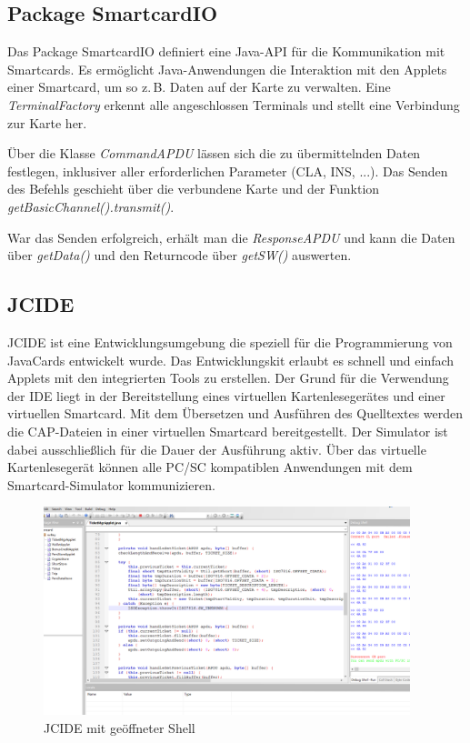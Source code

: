 \documentclass[	a4paper,
			11pt,
			oneside,
			parskip]{scrartcl}
\begin{document}
\subsection{Package SmartcardIO}

Das Package SmartcardIO definiert eine Java-API für die Kommunikation mit Smartcards. Es ermöglicht Java-Anwendungen die Interaktion mit den Applets einer Smartcard, um so z.\,B. Daten auf der Karte zu verwalten. Eine \textit{TerminalFactory} erkennt alle angeschlossen Terminals und stellt eine Verbindung zur Karte her.\medskip

Über die Klasse \textit{CommandAPDU} lässen sich die zu übermittelnden Daten festlegen, inklusiver aller erforderlichen Parameter (CLA, INS, ...). Das Senden des Befehls geschieht über die verbundene Karte und der Funktion \textit{getBasicChannel().transmit()}.\medskip

War das Senden erfolgreich, erhält man die \textit{ResponseAPDU} und kann die Daten über \textit{getData()} und den Returncode über \textit{getSW()} auswerten.

\subsection{JCIDE}

JCIDE ist eine Entwicklungsumgebung die speziell für die Programmierung von JavaCards entwickelt wurde. Das Entwicklungskit erlaubt es schnell und einfach Applets mit den integrierten Tools zu erstellen. Der Grund für die Verwendung der IDE liegt in der Bereitstellung eines virtuellen Kartenlesegerätes und einer virtuellen Smartcard. Mit dem Übersetzen und Ausführen des Quelltextes werden die CAP-Dateien in einer virtuellen Smartcard bereitgestellt. Der Simulator
ist dabei ausschließlich für die Dauer der Ausführung aktiv. Über das virtuelle Kartenlesegerät können alle PC/SC kompatiblen Anwendungen mit dem Smartcard-Simulator kommunizieren.\medskip

\begin{figure}[!htb]
	\centering
  	\includegraphics[width=0.95\textwidth]{img/jcide}
	\caption{JCIDE mit geöffneter Shell}
	\label{jcide}
\end{figure}
\end{document}

